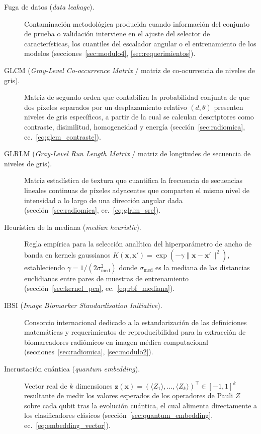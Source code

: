 \begin{description}
  \item[Fuga de datos (\textit{data leakage}).] Contaminación metodológica producida cuando información del conjunto de prueba o validación interviene en el ajuste del selector de características, los cuantiles del escalador angular o el entrenamiento de los modelos (secciones~\ref{sec:modulo4}, \ref{sec:requerimientos}).

  \item[GLCM (\textit{Gray-Level Co-occurrence Matrix} / matriz de co-ocurrencia de niveles de gris).] Matriz de segundo orden que contabiliza la probabilidad conjunta de que dos píxeles separados por un desplazamiento relativo $(d, \theta)$ presenten niveles de gris específicos, a partir de la cual se calculan descriptores como contraste, disimilitud, homogeneidad y energía (sección~\ref{sec:radiomica}, ec.~\ref{eq:glcm_contraste}).

  \item[GLRLM (\textit{Gray-Level Run Length Matrix} / matriz de longitudes de secuencia de niveles de gris).] Matriz estadística de textura que cuantifica la frecuencia de secuencias lineales continuas de píxeles adyacentes que comparten el mismo nivel de intensidad a lo largo de una dirección angular dada (sección~\ref{sec:radiomica}, ec.~\ref{eq:glrlm_sre}).

  \item[Heurística de la mediana (\textit{median heuristic}).] Regla empírica para la selección analítica del hiperparámetro de ancho de banda en kernels gaussianos $K(\mathbf{x}, \mathbf{x}') = \exp(-\gamma \|\mathbf{x} - \mathbf{x}'\|^2)$, estableciendo $\gamma = 1 / (2 \sigma_{\mathrm{med}}^2)$ donde $\sigma_{\mathrm{med}}$ es la mediana de las distancias euclidianas entre pares de muestras de entrenamiento (sección~\ref{sec:kernel_pca}, ec.~\ref{eq:rbf_mediana}).

  \item[IBSI (\textit{Image Biomarker Standardisation Initiative}).] Consorcio internacional dedicado a la estandarización de las definiciones matemáticas y requerimientos de reproducibilidad para la extracción de biomarcadores radiómicos en imagen médica computacional (secciones~\ref{sec:radiomica}, \ref{sec:modulo2}).

  \item[Incrustación cuántica (\textit{quantum embedding}).] Vector real de $k$ dimensiones $\mathbf{z}(\mathbf{x}) = (\langle Z_1 \rangle, \dots, \langle Z_k \rangle)^\top \in [-1, 1]^k$ resultante de medir los valores esperados de los operadores de Pauli $Z$ sobre cada qubit tras la evolución cuántica, el cual alimenta directamente a los clasificadores clásicos (sección~\ref{sec:quantum_embedding}, ec.~\ref{eq:embedding_vector}).


\end{description}
